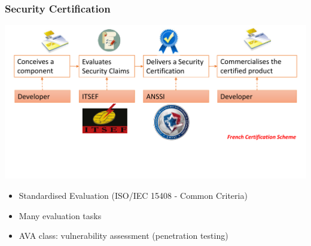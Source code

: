\begin{frame}
\frametitle{Security Certification}
\centering
\includegraphics[width = .9\textwidth]{figures/ITSEF_nobody.pdf}
\begin{itemize}
\item Standardised Evaluation (\eg ISO/IEC 15408 - Common Criteria)
\item Many evaluation tasks
\item AVA class: vulnerability assessment (penetration testing)
\end{itemize}
\end{frame}
%
